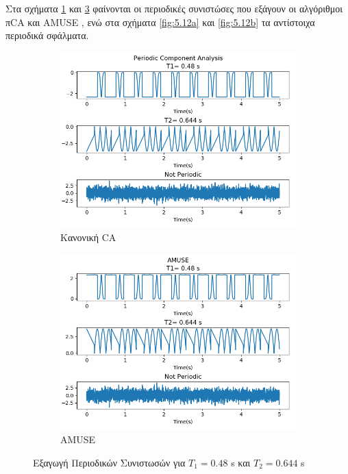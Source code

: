 \noindent Στα σχήματα \en \ref{fig:5.11a} \gr και \en \ref{fig:5.11b} \gr φαίνονται οι περιοδικές συνιστώσες που εξάγουν οι αλγόριθμοι π\en CA \gr και \en AMUSE \gr, ενώ στα σχήματα \en \ref{fig:5.12a} \gr και \en \ref{fig:5.12b} \gr τα αντίστοιχα περιοδικά σφάλματα.
\en
\begin{figure}[H]
    \centering
    \begin{subfigure}{0.48 \textwidth}
        \centering
       \includegraphics[width=\textwidth]{fwto/pica.png}\en
        \caption{\gr Κανονική \en \pi CA} \gr
        \label{fig:5.11a}
    \end{subfigure}
    \hfill
    \begin{subfigure}{0.48 \textwidth}
        \centering
       \includegraphics[width=\textwidth]{fwto/amuse.png}
        \en
        \caption{AMUSE} \gr
        \label{fig:5.11b}
    \end{subfigure}
    \gr
    \caption{Εξαγωγή Περιοδικών Συνιστωσών για \en $T_1 = 0.48$ s \gr και \en $T_2 = 0.644$ s \gr}
\end{figure}
